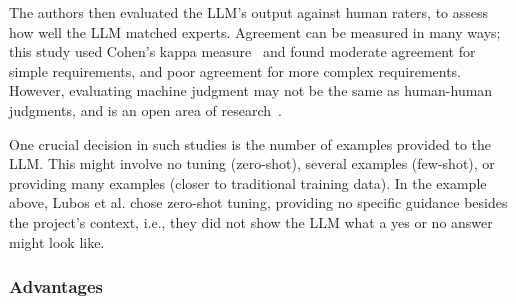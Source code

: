 The authors then evaluated the LLM's output against human raters, to assess how well the LLM matched experts. 
Agreement can be measured in many ways; this study used Cohen's kappa measure~\cite{cohen60} and found moderate agreement for simple requirements, and poor agreement for more complex requirements.
However, evaluating machine judgment may not be the same as human-human judgments, and is an open area of research~\cite{DBLP:journals/corr/abs-2410-03775}. 

One crucial decision in such studies is the number of examples provided to the LLM.
This might involve no tuning (zero-shot), several examples (few-shot), or providing many examples (closer to traditional training data).
In the example above, Lubos et al. chose zero-shot tuning, providing no specific guidance besides the project's context, i.e., they did not show the LLM what a yes or no answer might look like. 




\subsubsection{Advantages}

